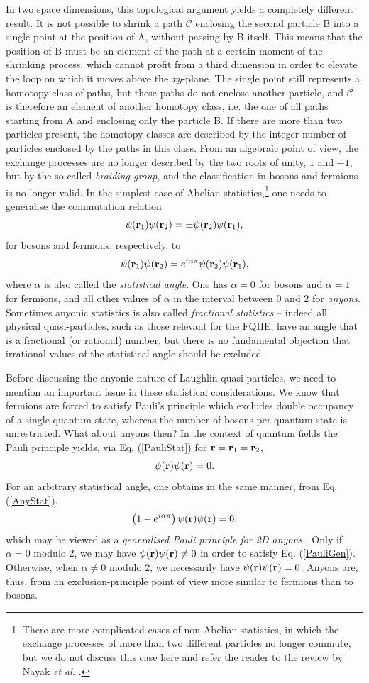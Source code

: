 \documentclass[10pt]{book}
\newcommand{\br}{{\bf r}}
\newcommand{\Cmath}{\mathcal{C}}
\newcommand{\beq}{\begin{equation}}
\newcommand{\eeq}{\end{equation}}
\begin{document}
In two space dimensions, this topological argument yields a completely different result. It is not possible to shrink a path $\Cmath$ 
enclosing the second particle B into a single point at the position of A, without passing by B itself. This means that the position of
B must be an element of the path at a certain moment of the shrinking process, which cannot profit from a third dimension
in order to elevate the loop on which it moves 
above the $xy$-plane. The single point still represents a homotopy class of paths, but these paths
do not enclose another particle, and $\Cmath$ is therefore an element of another homotopy class, i.e. the one of all
paths starting from A and enclosing only the particle B. If there are more than two particles present, the homotopy classes are described
by the integer number of particles enclosed by the paths in this class. From an algebraic point of view, the exchange processes
are no longer described by the two roots of unity, $1$ and $-1$, but by the so-called {\sl braiding group}, and the classification
in bosons and fermions is no longer valid. In the simplest case of Abelian statistics,\footnote{There are more complicated
cases of non-Abelian statistics, in which the exchange processes of more than two different particles no longer commute, but we do not
discuss this case here and refer the reader to the review by Nayak {\sl et al.} \cite{nayak}.}
one needs to generalise the commutation relation
\beq\label{PauliStat}
\psi(\br_1)\psi(\br_2)=\pm \psi(\br_2)\psi(\br_1),
\eeq
for bosons and fermions, respectively, to 
\beq\label{AnyStat}
\psi(\br_1)\psi(\br_2)=e^{i\alpha\pi} \psi(\br_2)\psi(\br_1),
\eeq
where $\alpha$ is also called the {\sl statistical angle}. One has $\alpha=0$ for bosons and $\alpha=1$ for fermions,
and all other values of $\alpha$ in the interval between 0 and 2 for {\sl anyons}. Sometimes anyonic statistics is also called
{\sl fractional statistics} -- indeed all physical quasi-particles, such as those relevant for 
the FQHE, have an angle that is a fractional 
(or rational) number, but there is no fundamental objection that irrational values of the statistical angle should be excluded.

Before discussing the anyonic nature of Laughlin quasi-particles, we need to mention an important issue in these statistical
considerations. We know that fermions are forced to satisfy Pauli's principle which excludes double occupancy of a single
quantum state, whereas the number of bosons per quantum state is unrestricted. What about anyons then? In the context of
quantum fields the Pauli principle yields, via Eq. (\ref{PauliStat}) for $\br=\br_1=\br_2$,
$$
\psi(\br)\psi(\br)=0.
$$
For an arbitrary statistical angle, one obtains in the same manner, from Eq. (\ref{AnyStat}),
\beq\label{PauliGen}
\left(1-e^{i\alpha\pi}\right)\psi(\br)\psi(\br)=0,
\eeq
which may be viewed as a {\sl generalised Pauli principle for 2D anyons} \cite{haldane2}.
Only if $\alpha=0$ modulo 2, we may have $\psi(\br)\psi(\br)\neq 0$ in order to satisfy Eq. (\ref{PauliGen}).
Otherwise, when $\alpha\neq 0$ modulo 2, we necessarily have $\psi(\br)\psi(\br)=0$. Anyons are, thus, from
an exclusion-principle point of view more similar to fermions than to bosons.
\end{document}
